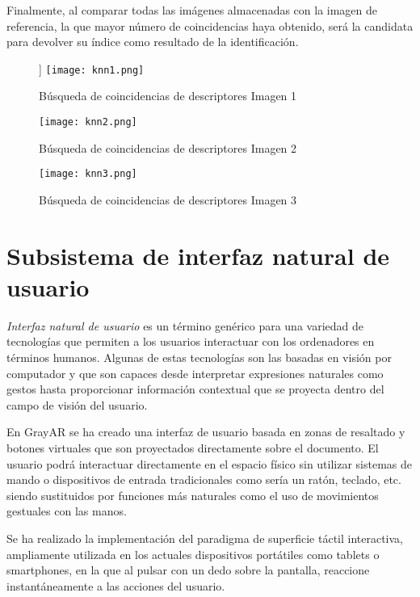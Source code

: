 Finalmente, al comparar todas las imágenes almacenadas con la imagen
de referencia, la que mayor número de coincidencias haya obtenido, será
la candidata para devolver su índice como resultado de la identificación.

  \begin{figure}] 
    \centering
    \texttt{[image: knn1.png]}
    \caption{Búsqueda de coincidencias de descriptores Imagen 1}
    \label{fig:knn1}
  \end{figure}



  \begin{figure} 
    \centering
    \texttt{[image: knn2.png]}
    \caption{Búsqueda de coincidencias de descriptores Imagen 2}
    \label{fig:knn2}
  \end{figure}



  \begin{figure} 
    \centering
    \texttt{[image: knn3.png]}
    \caption{Búsqueda de coincidencias de descriptores Imagen 3}
    \label{fig:knn3}
  \end{figure}



\section{Subsistema de interfaz natural de usuario}

\emph{Interfaz natural de usuario} es un término genérico para una variedad de tecnologías que
permiten a los usuarios interactuar con los ordenadores en términos humanos. Algunas de
estas tecnologías son las basadas en visión por computador y que son
capaces desde interpretar expresiones naturales como gestos hasta proporcionar información contextual que se
proyecta dentro del campo de visión del usuario.

En GrayAR se ha creado una interfaz de usuario basada en zonas de
resaltado y botones virtuales que son proyectados directamente sobre
el documento. El usuario podrá interactuar directamente en el espacio físico sin utilizar sistemas de mando o dispositivos de entrada tradicionales como sería un ratón,
teclado, etc. siendo sustituidos por funciones más naturales como el
uso de movimientos gestuales con las manos.

Se ha realizado la implementación del paradigma de superficie táctil interactiva,
ampliamente utilizada en los actuales dispositivos portátiles como
tablets o smartphones, en la que al pulsar con un dedo sobre la
pantalla, reaccione instantáneamente a las acciones del usuario.

